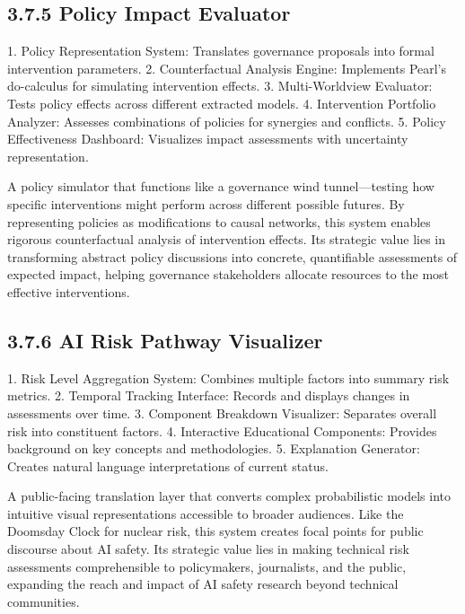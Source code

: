 \documentclass[
  11pt,
  letterpaper,
]{book}
\begin{document}
\subsection*{\texorpdfstring{3.7.5 \textbf{Policy Impact
Evaluator}}{3.7.5 Policy Impact Evaluator}}\label{policy-impact-evaluator}

1. Policy Representation System: Translates governance proposals into
formal intervention parameters. 2. Counterfactual Analysis Engine:
Implements Pearl's do-calculus for simulating intervention effects. 3.
Multi-Worldview Evaluator: Tests policy effects across different
extracted models. 4. Intervention Portfolio Analyzer: Assesses
combinations of policies for synergies and conflicts. 5. Policy
Effectiveness Dashboard: Visualizes impact assessments with uncertainty
representation.

A policy simulator that functions like a governance wind
tunnel---testing how specific interventions might perform across
different possible futures. By representing policies as modifications to
causal networks, this system enables rigorous counterfactual analysis of
intervention effects. Its strategic value lies in transforming abstract
policy discussions into concrete, quantifiable assessments of expected
impact, helping governance stakeholders allocate resources to the most
effective interventions.

\subsection*{\texorpdfstring{3.7.6 \textbf{AI Risk Pathway
Visualizer}}{3.7.6 AI Risk Pathway Visualizer}}\label{ai-risk-pathway-visualizer}

1. Risk Level Aggregation System: Combines multiple factors into summary
risk metrics. 2. Temporal Tracking Interface: Records and displays
changes in assessments over time. 3. Component Breakdown Visualizer:
Separates overall risk into constituent factors. 4. Interactive
Educational Components: Provides background on key concepts and
methodologies. 5. Explanation Generator: Creates natural language
interpretations of current status.

A public-facing translation layer that converts complex probabilistic
models into intuitive visual representations accessible to broader
audiences. Like the Doomsday Clock for nuclear risk, this system creates
focal points for public discourse about AI safety. Its strategic value
lies in making technical risk assessments comprehensible to
policymakers, journalists, and the public, expanding the reach and
impact of AI safety research beyond technical communities.
\end{document}
